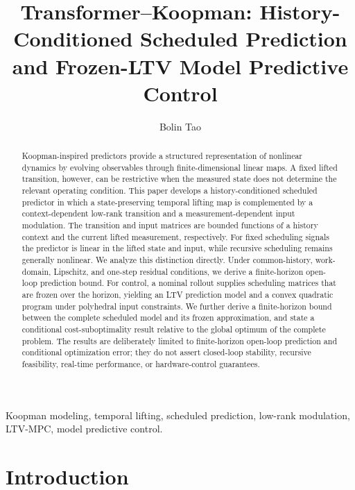 ﻿\documentclass[journal]{IEEEtran}
\begin{document}
\title{Transformer--Koopman: History-Conditioned Scheduled Prediction and Frozen-LTV Model Predictive Control}
\author{Bolin Tao}
\maketitle

\begin{abstract}
Koopman-inspired predictors provide a structured representation of nonlinear dynamics by evolving observables through finite-dimensional linear maps. A fixed lifted transition, however, can be restrictive when the measured state does not determine the relevant operating condition. This paper develops a history-conditioned scheduled predictor in which a state-preserving temporal lifting map is complemented by a context-dependent low-rank transition and a measurement-dependent input modulation. The transition and input matrices are bounded functions of a history context and the current lifted measurement, respectively. For fixed scheduling signals the predictor is linear in the lifted state and input, while recursive scheduling remains generally nonlinear. We analyze this distinction directly. Under common-history, work-domain, Lipschitz, and one-step residual conditions, we derive a finite-horizon open-loop prediction bound. For control, a nominal rollout supplies scheduling matrices that are frozen over the horizon, yielding an LTV prediction model and a convex quadratic program under polyhedral input constraints. We further derive a finite-horizon bound between the complete scheduled model and its frozen approximation, and state a conditional cost-suboptimality result relative to the global optimum of the complete problem. The results are deliberately limited to finite-horizon open-loop prediction and conditional optimization error; they do not assert closed-loop stability, recursive feasibility, real-time performance, or hardware-control guarantees.
\end{abstract}

\begin{IEEEkeywords}
Koopman modeling, temporal lifting, scheduled prediction, low-rank modulation, LTV-MPC, model predictive control.
\end{IEEEkeywords}

\section{Introduction}
\label{sec:introduction}
\end{document}
